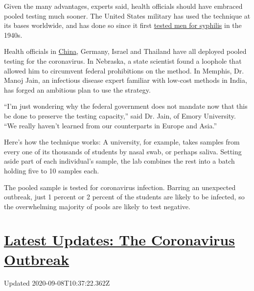 Given the many advantages, experts said, health officials should have
embraced pooled testing much sooner. The United States military has used
the technique at its bases worldwide, and has done so since it first
\href{https://projecteuclid.org/euclid.aoms/1177731363}{tested men for
syphilis} in the 1940s.

Health officials in
\href{https://www.nytimes3xbfgragh.onion/2020/05/14/world/asia/coronavirus-testing-china-wuhan.html}{China},
Germany, Israel and Thailand have all deployed pooled testing for the
coronavirus. In Nebraska, a state scientist found a loophole that
allowed him to circumvent federal prohibitions on the method. In
Memphis, Dr. Manoj Jain, an infectious disease expert familiar with
low-cost methods in India, has forged an ambitious plan to use the
strategy.

``I'm just wondering why the federal government does not mandate now
that this be done to preserve the testing capacity,'' said Dr. Jain, of
Emory University. ``We really haven't learned from our counterparts in
Europe and Asia.''

Here's how the technique works: A university, for example, takes samples
from every one of its thousands of students by nasal swab, or perhaps
saliva. Setting aside part of each individual's sample, the lab combines
the rest into a batch holding five to 10 samples each.

The pooled sample is tested for coronavirus infection. Barring an
unexpected outbreak, just 1 percent or 2 percent of the students are
likely to be infected, so the overwhelming majority of pools are likely
to test negative.

\hypertarget{latest-updates-the-coronavirus-outbreak}{%
\section{\texorpdfstring{\href{https://www.nytimes3xbfgragh.onion/2020/09/08/world/covid-19-coronavirus.html?action=click\&pgtype=Article\&state=default\&region=MAIN_CONTENT_1\&context=storylines_live_updates}{Latest
Updates: The Coronavirus
Outbreak}}{Latest Updates: The Coronavirus Outbreak}}\label{latest-updates-the-coronavirus-outbreak}}

Updated 2020-09-08T10:37:22.362Z

